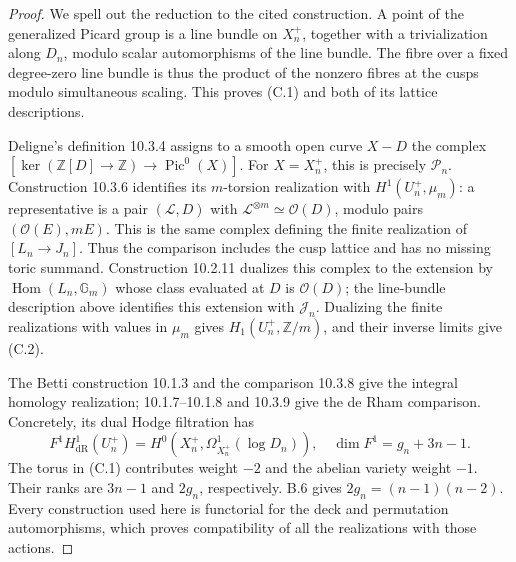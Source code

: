 \begin{proof}
We spell out the reduction to the cited construction. A point of the
generalized Picard group is a line bundle on \(X_n^+\), together with
a trivialization along \(D_n\), modulo scalar automorphisms of the
line bundle. The fibre over a fixed degree-zero line bundle is thus
the product of the nonzero fibres at the cusps modulo simultaneous
scaling. This proves (C.1) and both of its lattice descriptions.

Deligne's definition 10.3.4 assigns to a smooth open curve
\(X-D\) the complex
\([\ker(\mathbb Z[D]\to\mathbb Z)\to\operatorname{Pic}^0(X)]\).
For \(X=X_n^+\), this is precisely \(\mathcal P_n\).
Construction 10.3.6 identifies its \(m\)-torsion realization with
\(H^1(U_n^+,\mu_m)\): a representative is a pair
\((\mathcal L,D)\) with \(\mathcal L^{\otimes m}\simeq\mathcal O(D)\),
modulo pairs \((\mathcal O(E),mE)\). This is the same complex
defining the finite realization of \([L_n\to J_n]\).
Thus the comparison includes the cusp lattice and has no missing
toric summand. Construction 10.2.11 dualizes this complex to the
extension by \(\operatorname{Hom}(L_n,\mathbb G_m)\) whose class
evaluated at \(D\) is \(\mathcal O(D)\); the line-bundle description
above identifies this extension with \(\mathcal J_n\).
Dualizing the finite realizations with values in \(\mu_m\)
gives \(H_1(U_n^+,\mathbb Z/m)\), and their inverse limits give (C.2).

The Betti construction 10.1.3 and the comparison 10.3.8 give the
integral homology realization; 10.1.7--10.1.8 and 10.3.9 give the
de Rham comparison. Concretely, its dual Hodge filtration has
\[
 F^1H^1_{\mathrm{dR}}(U_n^+)
   =H^0(X_n^+,\Omega^1_{X_n^+}(\log D_n)),
 \quad \dim F^1=g_n+3n-1.
\]
The torus in (C.1) contributes weight \(-2\) and the abelian
variety weight \(-1\). Their ranks are \(3n-1\) and \(2g_n\),
respectively. B.6 gives \(2g_n=(n-1)(n-2)\).
Every construction used here is functorial for the deck and
permutation automorphisms, which proves compatibility of all
the realizations with those actions.
\end{proof}

